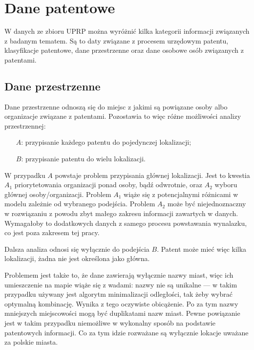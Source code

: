 \section{Dane patentowe}

W danych ze zbioru \ac{UPRP} można wyróżnić kilka kategorii informacji
związanych z badanym tematem. Są to daty związane z procesem urzędowym
patentu, klasyfikacje patentowe, dane przestrzenne oraz dane osobowe
osób związanych z patentami.

\subsection{Dane przestrzenne}

Dane przestrzenne odnoszą się do miejsc z jakimi są powiązane
osoby albo organizacje związane z patentami. Pozostawia to więc 
różne możliwości analizy przestrzennej:

\begin{enumerate}
\item[$A$:] przypisanie każdego patentu do pojedynczej lokalizacji;
\item[$B$:] przypisanie patentu do wielu lokalizacji.
\end{enumerate}

W przypadku $A$ powstaje problem przypisania głównej lokalizacji.
Jest to kwestia $A_1$ priorytetowania organizacji ponad osoby, bądź
odwrotnie, oraz $A_2$ wyboru głównej osoby/organizacji.
Problem $A_1$ wiąże się z potencjalnymi różnicami w modelu zależnie
od wybranego podejścia. Problem $A_2$ może być niejednoznaczny
w rozwiązaniu z powodu zbyt małego zakresu informacji zawartych w danych.
Wymagałoby to dodatkowych danych z samego procesu powstawania wynalazku,
co jest poza zakresem tej pracy.

Dalsza analiza odnosi się wyłącznie do podejścia $B$.
Patent może mieć więc kilka lokalizacji, żadna nie jest określona jako główna.

Problemem jest także to, że dane zawierają wyłącznie nazwy miast, 
więc ich umieszczenie na mapie wiąże się z wadami: 
nazwy nie są unikalne --- w takim przypadku używany jest algorytm minimalizacji 
odległości, tak żeby wybrać optymalną kombinację. 
Wynika z tego oczywiste obicążenie. 
Po za tym nazwy mniejszych miejscowości mogą być duplikatami
nazw miast. Pewne powiązanie jest w takim przypadku niemożliwe
w wykonalny sposób na podstawie patentowych informacji.
Co za tym idzie rozważane są wyłącznie lokacje uważane za polskie miasta.

